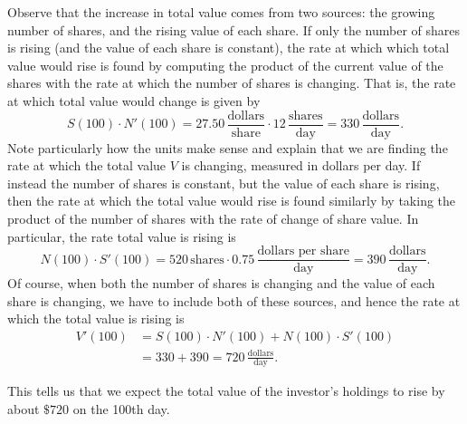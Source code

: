 Observe that the increase in total value comes from two sources: the growing number of shares, and the rising value of each share.  If only the number of shares is rising (and the value of each share is constant), the rate at which which total value would rise is found by computing the product of the current value of the shares with the rate at which the number of shares is changing.  That is, the rate at which total value would change is given by \small
\[ S(100) \cdot N'(100) = 27.50 \, \frac{\mbox{dollars}}{\mbox{share}} \cdot 12 \, \frac{\mbox{shares}}{\mbox{day}} = 330 \, \frac{\mbox{dollars}}{\mbox{day}}.\] \normalsize
Note particularly how the units make sense and explain that we are finding the rate at which the total value $V$ is changing, measured in dollars per day.  If instead the number of shares is constant, but the value of each share is rising, then the rate at which the total value would rise is found similarly by taking the product of the number of shares with the rate of change of share value.  In particular, the rate total value is rising is \small
\[ N(100) \cdot S'(100) = 520 \, \mbox{shares} \cdot 0.75 \, \frac{\mbox{dollars per share}}{\mbox{day}} = 390 \, \frac{\mbox{dollars}}{\mbox{day}}. \] \normalsize
Of course, when both the number of shares is changing and the value of each share is changing, we have to include both of these sources, and hence the rate at which the total value is rising is \small
\begin{align*}
V'(100) & = S(100) \cdot N'(100) + N(100) \cdot S'(100) \\
& = 330 + 390 = 720 \, \frac{\mbox{dollars}}{\mbox{day}}.
\end{align*}\normalsize

This tells us that we expect the total value of the investor's holdings to rise by about $\$720$ on the 100th day.

